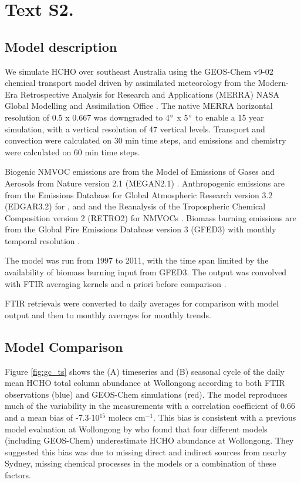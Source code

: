 \documentclass[draft]{agujournal}
\begin{document}
\section*{Text S2.}

\subsection*{Model description}

We simulate HCHO over southeast Australia using the GEOS-Chem v9-02 chemical transport model driven by assimilated meteorology from the Modern-Era Retrospective Analysis for Research and Applications (MERRA) NASA Global Modelling and Assimilation Office \citep{Bey2001,Rienecker2011}. The native MERRA horizontal resolution of 0.5 \degree x 0.667 \degree was downgraded to 4$\degree$ x 5$\degree$ to enable a 15 year simulation, with a vertical resolution of 47 vertical levels. Transport and convection were calculated on 30 min time steps, and emissions and chemistry were calculated on 60 min time steps.

Biogenic NMVOC emissions are from the Model of Emissions of Gases and Aerosols from Nature version 2.1 (MEGAN2.1) \citep{Guenther2012}. Anthropogenic emissions are from the Emissions Database for Global Atmospheric Research version 3.2 (EDGAR3.2) for ,  and  \citep{Olivier2005} and the Reanalysis of the Tropospheric Chemical Composition version 2 (RETRO2) for NMVOCs \citep{Hu2015}. Biomass burning emissions are from the Global Fire Emissions Database version 3 (GFED3) with monthly temporal resolution \citep{VanDerWerf2010}.

The model was run from 1997 to 2011, with the time span limited by the availability of biomass burning input from GFED3. The output was convolved with FTIR averaging kernels and a priori before comparison \citep{Rodgers2003}.

FTIR retrievals were converted to daily averages for comparison with model output and then to monthly averages for monthly trends.

\subsection*{Model Comparison}

Figure \ref{fig:gc_ts} shows the (A) timeseries and (B) seasonal cycle of the daily mean HCHO total column abundance at Wollongong according to both FTIR observations (blue) and GEOS-Chem simulations (red). The model reproduces much of the variability in the measurements with a correlation coefficient of 0.66 and a mean bias of -7.3$\cdot$10$^{15}$ molecs cm$^{-1}$. This bias is consistent with a previous model evaluation at Wollongong by \citet{Zeng2015} who found that four different models (including GEOS-Chem) underestimate HCHO abundance at Wollongong. They suggested this bias was due to missing direct and indirect sources from nearby Sydney, missing chemical processes in the models or a combination of these factors. 
\end{document}
